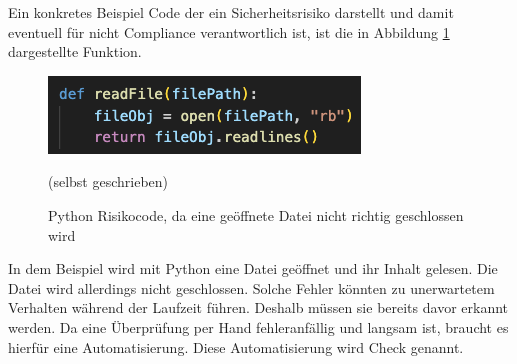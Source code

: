 \documentclass[../main.tex]{subfiles}
\begin{document}
Ein konkretes Beispiel Code der ein Sicherheitsrisiko darstellt und damit eventuell für nicht Compliance verantwortlich ist, ist die in Abbildung \ref{fig:codecompliance} dargestellte Funktion.

\begin{figure}[ht]
    \centering
    \includegraphics[scale=1]{bilder/CodeScreenShot.png}
    \caption{Python Risikocode, da eine geöffnete Datei nicht richtig geschlossen wird}
    \footnotesize (selbst geschrieben)
    \label{fig:codecompliance}
\end{figure}

In dem Beispiel wird mit Python eine Datei geöffnet und ihr Inhalt gelesen.
Die Datei wird allerdings nicht geschlossen.
Solche Fehler könnten zu unerwartetem Verhalten während der Laufzeit führen.
Deshalb müssen sie bereits davor erkannt werden.
Da eine Überprüfung per Hand fehleranfällig und langsam ist, braucht es hierfür eine Automatisierung.
Diese Automatisierung wird Check genannt.
\end{document}
